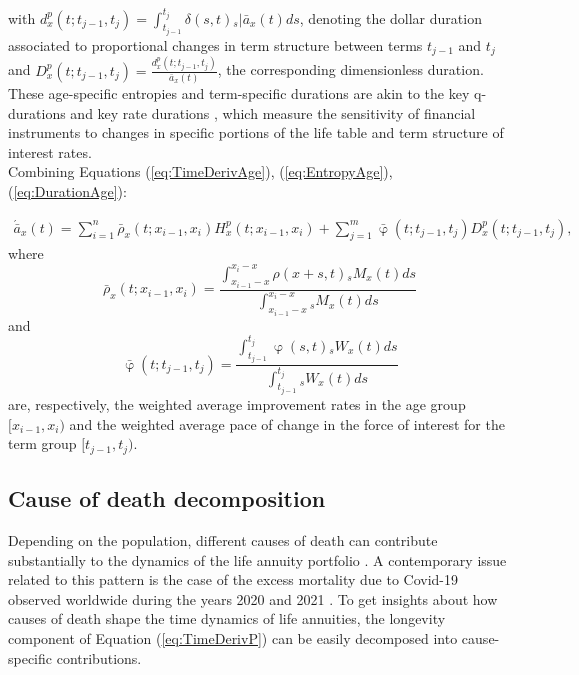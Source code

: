 \documentclass[12pt]{article}
\begin{document}
with ${d}^{p}_{x}(t;t_{j-1},t_{j}) = \int_{t_{j-1}}^{t_j} \delta(s,t) {}_s|\bar{a}_x(t)ds$, denoting the dollar duration associated to proportional changes in term structure between terms $t_{j-1}$ and $t_{j}$ and ${D}^{p}_{x}(t;t_{j-1},t_{j}) = \frac{{d}^{p}_{x}(t;t_{j-1},t_{j})}{\bar{a}_x(t)}$, the corresponding dimensionless duration. These age-specific entropies and term-specific durations are akin to the key q-durations \citep{li2012key} and key rate durations \citep{Ho1992}, which measure the sensitivity of financial instruments to changes in specific portions of the life table and term structure of interest rates.\\

Combining Equations (\ref{eq:TimeDerivAge}), (\ref{eq:EntropyAge}), (\ref{eq:DurationAge}):  

\begin{equation}\label{eq:TimeDerivAge2}
\begin{split}
 \acute{\bar{a}}_x(t) = \sum_{i=1}^n\bar{\rho}_x(t;x_{i-1}, x_i){H}^{p}_x(t;x_{i-1}, x_i) +\sum_{j=1}^m\bar{\upvarphi}(t;t_{j-1},t_{j}){D}^{p}_x(t;t_{j-1},t_{j}),  
\end{split}
\end{equation}
where $$\bar{\rho}_x(t;x_{i-1}, x_i)= \frac{\int_{x_{i-1}-x}^{x_i-x} \rho(x+s,t) {}_sM_x(t)  ds}{\int_{x_{i-1}-x}^{x_i-x}  {}_sM_x(t)ds}$$ and 
$$\bar{\upvarphi}(t;t_{j-1},t_{j})= \frac{\int_{t_{j-1}}^{t_{j}} \upvarphi(s,t) {}_sW_x(t)  ds}{\int_{t_{j-1}}^{t_{j}} {}_sW_x(t) ds}$$ are, respectively, the weighted average improvement rates in the age group $[x_{i-1},x_{i})$ and the weighted average pace of change in the force of interest for the term group $[t_{j-1},t_{j})$. 





\subsection{Cause of death decomposition}

Depending on the population, different causes of death can contribute substantially to the dynamics of the life annuity portfolio \citep{lin2005securitization,kallestrup2020insight}. A contemporary issue related to this pattern is the case of the excess mortality due to Covid-19 observed worldwide during the years 2020 and 2021 \citep{aburto2022quantifying}. To get insights about how causes of death shape the time dynamics of life annuities, the longevity component of Equation (\ref{eq:TimeDerivP}) can be easily decomposed into cause-specific contributions. 
\end{document}

